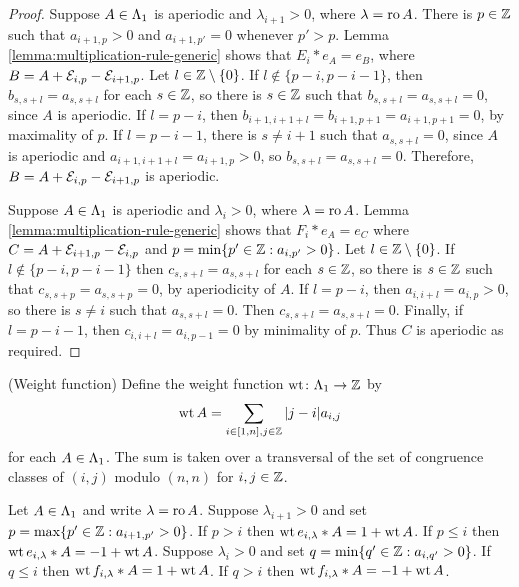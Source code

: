 \documentclass[a4paper, 11pt]{report}
\begin{document}
\begin{proof}
Suppose $A\in{\Lambda_1}$ is aperiodic and $\lambda_{i+1}>0$, where $\lambda=\operatorname{ro}{A}$. There is $p\in\mathbb{Z}$ such that $a_{i+1,p}>0$ and $a_{i+1,p'}=0$ whenever $p'>p$. Lemma \ref{lemma:multiplication-rule-generic} shows that $E_i\ast e_A = e_B$, where $B=A+\mathcal{E}_{i,p}-\mathcal{E}_{i+1,p}$. Let $l\in\mathbb{Z}\setminus\{0\}$. If $l\notin\{p-i,p-i-1\}$, then $b_{s,s+l}=a_{s,s+l}$ for each $s\in\mathbb{Z}$, so there is $s\in\mathbb{Z}$ such that $b_{s,s+l}=a_{s,s+l}=0$, since $A$ is aperiodic. If $l=p-i$, then $b_{i+1,i+1+l} = b_{i+1,p+1}=a_{i+1,p+1}=0$, by maximality of $p$. If $l=p-i-1$, there is $s\neq i+1$ such that $a_{s,s+l}=0$, since $A$ is aperiodic and $a_{i+1,i+1+l}=a_{i+1,p}>0$, so $b_{s,s+l}=a_{s,s+l}=0$. Therefore, $B=A+\mathcal{E}_{i,p}-\mathcal{E}_{i+1,p}$ is aperiodic.

Suppose $A\in{\Lambda_1}$ is aperiodic and $\lambda_i>0$, where $\lambda=\operatorname{ro}{A}$. Lemma \ref{lemma:multiplication-rule-generic} shows that $F_i\ast e_A = e_C$ where $C=A+\mathcal{E}_{i+1,p}-\mathcal{E}_{i,p}$ and $p=\min\{p'\in\mathbb{Z}: a_{i,p'}>0\}$. Let $l\in\mathbb{Z}\setminus\{0\}$. If $l\notin\{p-i,p-i-1\}$ then $c_{s,s+l}=a_{s,s+l}$ for each $s\in\mathbb{Z}$, so there is $s\in\mathbb{Z}$ such that $c_{s,s+p}=a_{s,s+p}=0$, by aperiodicity of $A$. If $l=p-i$, then $a_{i,i+l}=a_{i,p}>0$, so there is $s\neq i$ such that $a_{s,s+l}=0$. Then $c_{s,s+l}=a_{s,s+l}=0$. Finally, if $l=p-i-1$, then $c_{i,i+l}=a_{i,p-1}=0$ by minimality of $p$. Thus $C$ is aperiodic as required.
\end{proof}

\begin{definition}(Weight function)\label{def:weight-function}
Define the weight function $\operatorname{wt}\colon{\Lambda_1}\to\mathbb{Z}$ by
\begin{equation*}
\operatorname{wt}{A} = \sum_{i\in[1,n],j\in\mathbb{Z}} |j-i|a_{i,j}
\end{equation*}
for each $A\in{\Lambda_1}$. The sum is taken over a transversal of the set of congruence classes of $(i,j)$ modulo $(n,n)$ for $i,j\in\mathbb{Z}$.
\end{definition}

\begin{lemma}\label{lemma:decreasing-weight}
Let $A\in{\Lambda_1}$ and write $\lambda=\operatorname{ro}{A}$. Suppose $\lambda_{i+1}>0$ and set $p=\max\{p'\in\mathbb{Z}: a_{i+1,p'}>0\}$. If $p>i$ then $\operatorname{wt}{e_{i,\lambda}\ast A}=1+\operatorname{wt}{A}$. If $p\le i$ then $\operatorname{wt}{e_{i,\lambda}\ast A}=-1+\operatorname{wt}{A}$. Suppose $\lambda_i>0$ and set $q=\min\{q'\in\mathbb{Z}: a_{i,q'}>0\}$. If $q\le i$ then $\operatorname{wt}{f_{i,\lambda}\ast A}=1+\operatorname{wt}{A}$. If $q>i$ then $\operatorname{wt}{f_{i,\lambda}\ast A}=-1+\operatorname{wt}{A}$.
\end{lemma}
\end{document}
